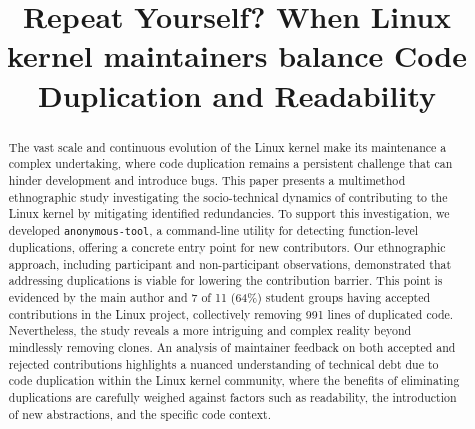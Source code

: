 \documentclass[10pt,conference]{IEEEtran}
\begin{document}
\title{Repeat Yourself? When Linux kernel maintainers balance Code Duplication and Readability}



\author{}


\maketitle

\begin{abstract}
The vast scale and continuous evolution of the Linux kernel make its maintenance a complex undertaking, where code duplication remains a persistent challenge that can hinder development and introduce bugs. This paper presents a multimethod ethnographic study investigating the socio-technical dynamics of contributing to the Linux kernel by mitigating identified redundancies. To support this investigation, we developed \texttt{anonymous-tool}, a command-line utility for detecting function-level duplications, offering a concrete entry point for new contributors. Our ethnographic approach, including participant and non-participant observations, demonstrated that addressing duplications is viable for lowering the contribution barrier. This point is evidenced by the main author and 7 of 11 (64\%) student groups having accepted contributions in the Linux project, collectively removing 991 lines of duplicated code. Nevertheless, the study reveals a more intriguing and complex reality beyond mindlessly removing clones. An analysis of maintainer feedback on both accepted and rejected contributions highlights a nuanced understanding of technical debt due to code duplication within the Linux kernel community, where the benefits of eliminating duplications are carefully weighed against factors such as readability, the introduction of new abstractions, and the specific code context.
\end{abstract}
\end{document}
